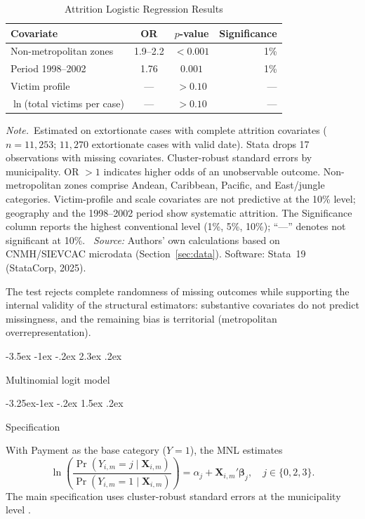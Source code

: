 \documentclass[12pt]{article}
\makeatletter
\numberwithin{equation}{section}
\numberwithin{table}{section}
\renewcommand\section{\@startsection {section}{1}{\z@}%
                                   {-3.5ex \@plus -1ex \@minus -.2ex}%
                                   {2.3ex \@plus.2ex}%
                                   {\normalfont\Large\bfseries\raggedright}}
\renewcommand\subsection{\@startsection{subsection}{2}{\z@}%
                                     {-3.25ex\@plus -1ex \@minus -.2ex}%
                                     {1.5ex \@plus .2ex}%
                                     {\normalfont\large\bfseries\raggedright}}
\newcommand{\tabnote}{\par\addvspace{0.4em}\noindent\emph{Note.}}
\newcommand{\tabsource}{\ \textit{Source:} Authors' own calculations based on
CNMH/SIEVCAC microdata (Section~\ref{sec:data}). Software: Stata~19
(StataCorp, 2025).}
\makeatother
\begin{document}
\begin{table}[t]
\centering
\caption{Attrition Logistic Regression Results}
\label{tab:attrition}
\small
\begin{tabular}{@{}lccr@{}}
\toprule
Covariate & OR & $p$-value & Significance \\
\midrule
Non-metropolitan zones & 1.9--2.2 & $<0.001$ & 1\% \\
Period 1998--2002 & 1.76 & $0.001$ & 1\% \\
Victim profile & --- & $>0.10$ & --- \\
$\ln$(total victims per case) & --- & $>0.10$ & --- \\
\bottomrule
\end{tabular}
\tabnote\ Estimated on extortionate cases with complete attrition covariates
($n=11{,}253$; $11{,}270$ extortionate cases with valid date). Stata drops 17
observations with missing covariates. Cluster-robust standard errors by
municipality. OR $>1$ indicates higher odds of an unobservable outcome.
Non-metropolitan zones comprise Andean, Caribbean, Pacific, and East/jungle
categories. Victim-profile and scale covariates are not predictive at the 10\%
level; geography and the 1998--2002 period show systematic attrition. The
Significance column reports the highest conventional level (1\%, 5\%, 10\%);
``---'' denotes not significant at 10\%.
\tabsource
\end{table}

The test rejects complete randomness of missing outcomes while supporting
the internal validity of the structural estimators: substantive covariates do
not predict missingness, and the remaining bias is territorial (metropolitan
overrepresentation).

\section{Multinomial logit model}
\label{sec:mnl}

\subsection{Specification}

With Payment as the base category ($Y=1$), the MNL estimates
\begin{equation}
\ln\!\left(\frac{\Pr(Y_{i,m}=j \mid \mathbf{X}_{i,m})}{\Pr(Y_{i,m}=1 \mid \mathbf{X}_{i,m})}\right)
= \alpha_j + \mathbf{X}_{i,m}'\boldsymbol{\beta}_j,
\quad j\in\{0,2,3\}.
\label{eq:mnl-app}
\end{equation}
The main specification uses cluster-robust standard errors at the municipality
level \citep{Wooldridge2010}.
\end{document}
